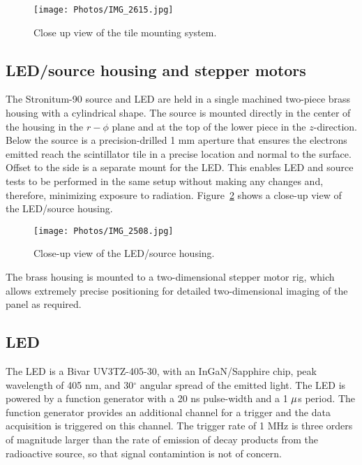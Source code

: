 \documentclass[12pt]{article}
\begin{document}
\begin{figure}
\begin{center}
\texttt{[image: Photos/IMG\_2615.jpg]}
\end{center}
\caption{Close up view of the tile mounting system.}
\label{picture:ucbmount}
\end{figure}


\subsection{LED/source housing and stepper motors}

The Stronitum-90 source and LED are held in a single machined two-piece brass housing with
a cylindrical shape.  The source is mounted directly in the center of the housing in the
$r-\phi$ plane and at the top of the lower piece in the $z$-direction.  Below the source
is a precision-drilled 1 mm aperture that ensures the electrons emitted reach the
scintillator tile in a precise location and normal to the surface.  Offset to the side is
a separate mount for the LED.  This enables LED and source tests to be performed in the
same setup without making any changes and, therefore, minimizing exposure to radiation.
Figure~\ref{picture:ucbhouse} shows a close-up view of the LED/source housing.

\begin{figure}
\begin{center}
\texttt{[image: Photos/IMG\_2508.jpg]}
\end{center}
\caption{Close-up view of the LED/source housing.}
\label{picture:ucbhouse}
\end{figure}

The brass housing is mounted to a two-dimensional stepper motor rig, which allows
extremely precise positioning for detailed two-dimensional imaging of the panel as
required.



\subsection{LED}

The LED is a Bivar UV3TZ-405-30, with an InGaN/Sapphire chip, peak wavelength of 405 nm,
and 30$^{\circ}$ angular spread of the emitted light.  The LED is powered by a function
generator with a 20 ns pulse-width and a 1 ${\rm \mu}$s period.  The function generator
provides an additional channel for a trigger and the data acquisition is triggered on this
channel.  The trigger rate of 1 MHz is three orders of magnitude larger than the rate of
emission of decay products from the radioactive source, so that signal contamintion is not
of concern.
\end{document}
